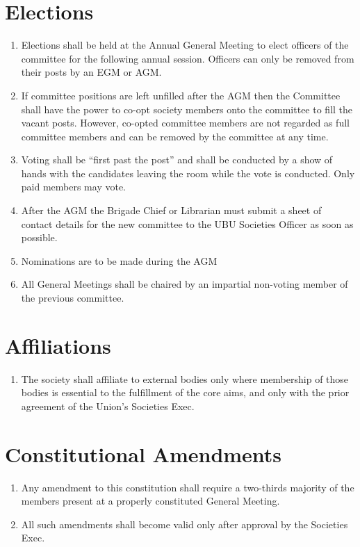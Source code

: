 \documentclass[a4paper,10pt]{article}
\begin{document}
\section{Elections}
\begin{enumerate}
  \item Elections shall be held at the Annual General Meeting to elect officers of the committee for the following annual session. Officers can only be removed from their posts by an EGM or AGM.
  \item If committee positions are left unfilled after the AGM then the Committee shall have the power to co-opt society members onto the committee to fill the vacant posts. However, co-opted committee members are not regarded as full committee members and can be removed by the committee at any time.
  \item Voting shall be “first past the post” and shall be conducted by a show of hands with the candidates leaving the room while the vote is conducted. Only paid members may vote.
  \item After the AGM the Brigade Chief or Librarian must submit a sheet of contact details for the new committee to the UBU Societies Officer as soon as possible.
  \item Nominations are to be made during the AGM
  \item All General Meetings shall be chaired by an impartial non-voting member of the previous committee.
\end{enumerate}

\section{Affiliations}
\begin{enumerate}
  \item The society shall affiliate to external bodies only where membership of those bodies is essential to the fulfillment of the core aims, and only with the prior agreement of the Union’s Societies Exec.
\end{enumerate}

\section{Constitutional Amendments}
\begin{enumerate}
  \item Any amendment to this constitution shall require a two-thirds majority of the members present at a properly constituted General Meeting.
  \item All such amendments shall become valid only after approval by the Societies Exec.
\end{enumerate}
\end{document}
